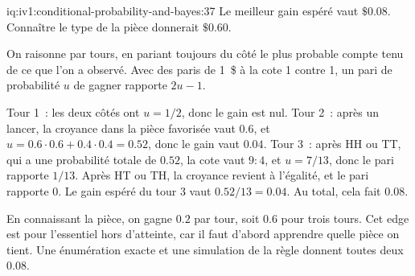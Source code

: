 \begin{solution}{iq:iv1:conditional-probability-and-bayes:37}
Le meilleur gain espéré vaut $\$0.08$. Connaître le type de la pièce donnerait $\$0.60$.

On raisonne par tours, en pariant toujours du côté le plus probable compte tenu de ce que l'on a observé. Avec des paris de 1~\$ à la cote 1 contre 1, un pari de probabilité $u$ de gagner rapporte $2u - 1$.

Tour 1~: les deux côtés ont $u = 1/2$, donc le gain est nul. Tour 2~: après un lancer, la croyance dans la pièce favorisée vaut $0.6$, et $u = 0.6 \cdot 0.6 + 0.4 \cdot 0.4 = 0.52$, donc le gain vaut $0.04$. Tour 3~: après HH ou TT, qui a une probabilité totale de $0.52$, la cote vaut $9 : 4$, et $u = 7/13$, donc le pari rapporte $1/13$. Après HT ou TH, la croyance revient à l'égalité, et le pari rapporte 0. Le gain espéré du tour 3 vaut $0.52/13 = 0.04$. Au total, cela fait $0.08$.

En connaissant la pièce, on gagne $0.2$ par tour, soit $0.6$ pour trois tours. Cet edge est pour l'essentiel hors d'atteinte, car il faut d'abord apprendre quelle pièce on tient. Une énumération exacte et une simulation de la règle donnent toutes deux $0.08$.

\end{solution}

